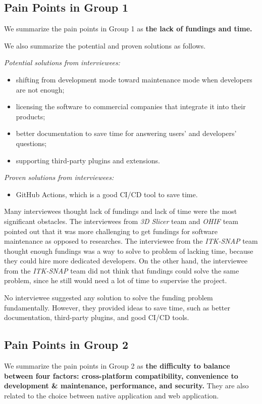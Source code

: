 \subsection{Pain Points in Group 1}
\label{sec_pain_points_1}
We summarize the pain points in Group 1 as
\textbf{the lack of fundings and time.}

We also summarize the potential and proven solutions as follows.

\textit{Potential solutions from interviewees:}
\begin{itemize}
\item shifting from development mode toward maintenance mode when developers are not enough;
\item licensing the software to commercial companies that integrate it into their products;
\item better documentation to save time for answering users' and developers' questions;
\item supporting third-party plugins and extensions.
\end{itemize}

\textit{Proven solutions from interviewees:}
\begin{itemize}
\item GitHub Actions, which is a good CI/CD tool to save time.
\end{itemize}

Many interviewees thought lack of fundings and lack of time were the most significant obstacles. The interviewees from \textit{3D Slicer} team and \textit{OHIF} team pointed out that it was more challenging to get fundings for software maintenance as opposed to researches. The interviewee from the \textit{ITK-SNAP} team thought enough fundings was a way to solve to problem of lacking time, because they could hire more dedicated developers. On the other hand, the interviewee from the \textit{ITK-SNAP} team did not think that fundings could solve the same problem, since he still would need a lot of time to supervise the project.

No interviewee suggested any solution to solve the funding problem fundamentally. However, they provided ideas to save time, such as better documentation, third-party plugins, and good CI/CD tools.

\subsection{Pain Points in Group 2}
\label{sec_pain_points_2}
We summarize the pain points in Group 2 as
\textbf{the difficulty to balance between four factors: cross-platform compatibility, convenience to development \& maintenance, performance, and security.} They are also related to the choice between native application and web application.

